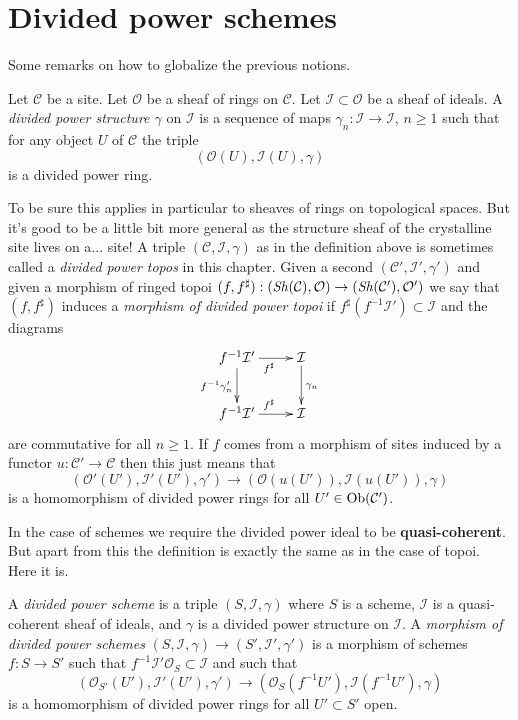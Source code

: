 \section{Divided power schemes}
\label{section-divided-power-schemes}

\noindent
Some remarks on how to globalize the previous notions.

\begin{definition}
\label{definition-divided-power-structure}
Let $\mathcal{C}$ be a site. Let $\mathcal{O}$ be a sheaf of rings
on $\mathcal{C}$. Let $\mathcal{I} \subset \mathcal{O}$ be a
sheaf of ideals. A {\it divided power structure $\gamma$} on $\mathcal{I}$
is a sequence of maps $\gamma_n : \mathcal{I} \to \mathcal{I}$, $n \geq 1$
such that for any object $U$ of $\mathcal{C}$ the triple
$$
(\mathcal{O}(U), \mathcal{I}(U), \gamma)
$$
is a divided power ring.
\end{definition}

\noindent
To be sure this applies in particular to sheaves of rings on
topological spaces. But it's good to be a little bit more general
as the structure sheaf of the crystalline site lives on a... site!
A triple $(\mathcal{C}, \mathcal{I}, \gamma)$ as in the
definition above is sometimes called a {\it divided power topos}
in this chapter. Given a second $(\mathcal{C}', \mathcal{I}', \gamma')$ and
given a morphism of ringed topoi
$(f, f^\sharp) : (\mathop{\mathit{Sh}}\nolimits(\mathcal{C}), \mathcal{O}) \to
(\mathop{\mathit{Sh}}\nolimits(\mathcal{C}'), \mathcal{O}')$
we say that $(f, f^\sharp)$ induces a {\it morphism of divided
power topoi} if $f^\sharp(f^{-1}\mathcal{I}') \subset \mathcal{I}$
and the diagrams
$$
\xymatrix{
f^{-1}\mathcal{I}' \ar[d]_{f^{-1}\gamma'_n} \ar[r]_{f^\sharp} &
\mathcal{I} \ar[d]^{\gamma_n} \\
f^{-1}\mathcal{I}' \ar[r]^{f^\sharp} & \mathcal{I}
}
$$
are commutative for all $n \geq 1$. If $f$ comes from a morphism of
sites induced by a functor $u : \mathcal{C}' \to \mathcal{C}$ then
this just means that
$$
(\mathcal{O}'(U'), \mathcal{I}'(U'), \gamma')
\longrightarrow
(\mathcal{O}(u(U')), \mathcal{I}(u(U')), \gamma)
$$
is a homomorphism of divided power rings for all $U' \in \mathop{\mathrm{Ob}}\nolimits(\mathcal{C}')$.

\medskip\noindent
In the case of schemes we require the divided power ideal to be
{\bf quasi-coherent}. But apart from this the definition is exactly
the same as in the case of topoi. Here it is.

\begin{definition}
\label{definition-divided-power-scheme}
A {\it divided power scheme} is a triple $(S, \mathcal{I}, \gamma)$
where $S$ is a scheme, $\mathcal{I}$ is a quasi-coherent sheaf of
ideals, and $\gamma$ is a divided power structure on $\mathcal{I}$.
A {\it morphism of divided power schemes}
$(S, \mathcal{I}, \gamma) \to (S', \mathcal{I}', \gamma')$ is
a morphism of schemes $f : S \to S'$ such that
$f^{-1}\mathcal{I}'\mathcal{O}_S \subset \mathcal{I}$ and such that
$$
(\mathcal{O}_{S'}(U'), \mathcal{I}'(U'), \gamma')
\longrightarrow
(\mathcal{O}_S(f^{-1}U'), \mathcal{I}(f^{-1}U'), \gamma)
$$
is a homomorphism of divided power rings for all $U' \subset S'$ open.
\end{definition}


